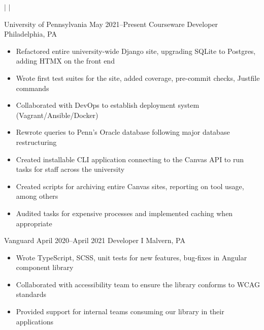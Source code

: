 \documentclass{article}
\begin{document}
\begin{center}
  \name{\fullName}

  \vspace{0.2em}

  \link{\email}
    $|$
    \small{\phone}
    $|$
    \link{\github}
\end{center}


\begin{itemize}[leftmargin=0em, label={}]
    \experience
        {University of Pennsylvania}
        {May 2021--Present}
        {Courseware Developer}
        {Philadelphia, PA}
        \begin{itemize}
          \item \small Refactored entire university-wide Django site, upgrading
            SQLite to Postgres, adding HTMX on the front end
          \item \small Wrote first test suites for the site, added coverage,
            pre-commit checks, Justfile commands
          \item \small Collaborated with DevOps to establish deployment system
            (Vagrant/Ansible/Docker)
          \item \small Rewrote queries to Penn’s Oracle database following major
            database restructuring
          \item \small Created installable CLI application connecting to the
            Canvas API to run tasks for staff across the university
          \item \small Created scripts for archiving entire Canvas sites,
            reporting on tool usage, among others
          \item \small Audited tasks for expensive processes and implemented
            caching when appropriate
        \end{itemize}
    \experience
        {Vanguard}
        {April 2020--April 2021}
        {Developer I}
        {Malvern, PA}
        \begin{itemize}
          \item \small Wrote TypeScript, SCSS, unit tests for new features,
            bug-fixes in Angular component library
          \item \small Collaborated with accessibility team to ensure the
            library conforms to WCAG standards
          \item \small Provided support for internal teams consuming our library
            in their applications

\end{itemize}
\end{itemize}
\end{document}
